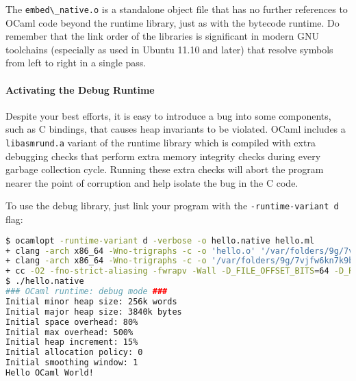 The \passthrough{\lstinline!embed\_native.o!} is a standalone object
file that has no further references to OCaml code beyond the runtime
library, just as with the bytecode runtime. Do remember that the link
order of the libraries is significant in modern GNU toolchains
(especially as used in Ubuntu 11.10 and later) that resolve symbols from
left to right in a single
pass.

\hypertarget{activating-the-debug-runtime}{%
\paragraph{Activating the Debug
Runtime}\label{activating-the-debug-runtime}}

Despite your best efforts, it is easy to introduce a bug into some
components, such as C bindings, that causes heap invariants to be
violated. OCaml includes a \passthrough{\lstinline!libasmrund.a!}
variant of the runtime library which is compiled with extra debugging
checks that perform extra memory integrity checks during every garbage
collection cycle. Running these extra checks will abort the program
nearer the point of corruption and help isolate the bug in the C code.

To use the debug library, just link your program with the
\passthrough{\lstinline!-runtime-variant d!} flag:

\begin{lstlisting}[language=bash]
$ ocamlopt -runtime-variant d -verbose -o hello.native hello.ml
+ clang -arch x86_64 -Wno-trigraphs -c -o 'hello.o' '/var/folders/9g/7vjfw6kn7k9bs721d_zjzn7h0000gn/T/camlasm9b916c.s'
+ clang -arch x86_64 -Wno-trigraphs -c -o '/var/folders/9g/7vjfw6kn7k9bs721d_zjzn7h0000gn/T/camlstartup8f1c0d.o' '/var/folders/9g/7vjfw6kn7k9bs721d_zjzn7h0000gn/T/camlstartupf69d9a.s'
+ cc -O2 -fno-strict-aliasing -fwrapv -Wall -D_FILE_OFFSET_BITS=64 -D_REENTRANT -DCAML_NAME_SPACE   -Wl,-no_compact_unwind -o 'hello.native'   '-L/Users/thomas/git/rwo/book/_opam/lib/ocaml'  '/var/folders/9g/7vjfw6kn7k9bs721d_zjzn7h0000gn/T/camlstartup8f1c0d.o' '/Users/thomas/git/rwo/book/_opam/lib/ocaml/std_exit.o' 'hello.o' '/Users/thomas/git/rwo/book/_opam/lib/ocaml/stdlib.a' '/Users/thomas/git/rwo/book/_opam/lib/ocaml/libasmrund.a'
$ ./hello.native
### OCaml runtime: debug mode ###
Initial minor heap size: 256k words
Initial major heap size: 3840k bytes
Initial space overhead: 80%
Initial max overhead: 500%
Initial heap increment: 15%
Initial allocation policy: 0
Initial smoothing window: 1
Hello OCaml World!
\end{lstlisting}

